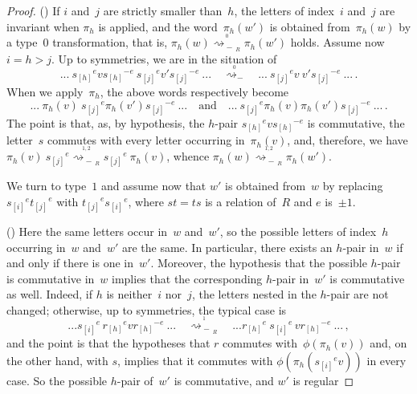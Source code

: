 \documentclass{amsart}
\numberwithin{equation}{section}
\theoremstyle{plain}
\theoremstyle{definition}
\newcounter{ITEM}
\begin{document}
\begin{proof}
{\setcounter{ITEM}{2}\leavevmode\hbox{\rm()}} If ${i}$ and~${j}$ are strictly smaller than~${h}$, the letters of index~${i}$ and~${j}$ are invariant when $\pi_{h}$ is applied, and the word~$\pi_{h}({w}')$ is obtained from~$\pi_{h}({w})$ by a type~$0$ transformation, that is, $\pi_{h}({w}) {\mathrel{\overset{{}_{{0}}}{\rightsquigarrow_{\!\!\!\!\!\!-\,{{\!{}_{R}}}}}}} \pi_{h}({w}')$ holds. Assume now ${i} = {h} > {j}$.
Up to symmetries, we are in the situation of
$$ ... \ {{s}_{[{h}]}}^{e} {v} {{s}_{[{h}]}}^{-{e}} \ {{s}_{[{j}]}}^{e} {v}' {{s}_{[{j}]}}^{-{e}} \ ... \quad{\mathrel{\overset{{}_{0}}{\rightsquigarrow_{\!\!\!\!\!\!-}}}}\quad ... \ {{s}_{[{j}]}}^{e} {v} \ {v}' {{s}_{[{j}]}}^{-{e}}\ ... \, .$$
When we apply~$\pi_{h}$, the above words respectively become
$$ ... \ \pi_{h}({v}) \ {{s}_{[{j}]}}^{e} \pi_{h}({v}') {{s}_{[{j}]}}^{-{e}} \ ... \quad \mbox{and}\quad ... \ {{s}_{[{j}]}}^{e} \pi_{h}({v}) \pi_{h}({v}') {{s}_{[{j}]}}^{-{e}} \ ... \, .$$
The point is that, as, by hypothesis, the ${h}$-pair ${{s}_{[{h}]}}^{e} {v} {{s}_{[{h}]}}^{-{e}}$ is commutative, the letter~${s}$ commutes with every letter occurring in~$\pi_{h}({v})$, and, therefore, we have $\pi_{h}({v}) \ {{s}_{[{j}]}}^{e} {\mathrel{\overset{{}_{{1,2}}}{\rightsquigarrow_{\!\!\!\!\!\!-\,{{\!{}_{R}}}}}}} {{s}_{[{j}]}}^{e} \ \pi_{h}({v})$, whence $\pi_{h}({w}) {\mathrel{\overset{{}_{{1,2}}}{\rightsquigarrow_{\!\!\!\!\!\!-\,{{\!{}_{R}}}}}}} \pi_{h}({w}')$.

We turn to type~$1$ and assume now that ${w}'$ is obtained from~${w}$ by replacing ${{s}_{[{i}]}}^{e} {{t}_{[{j}]}}^{e}$ with ${{t}_{[{j}]}}^{e} {{s}_{[{i}]}}^{e}$, where ${s} {t} = {t} {s}$ is a relation of~${R}$ and ${e}$ is~$\pm1$. 

{\setcounter{ITEM}{1}\leavevmode\hbox{\rm()}} Here the same letters occur in~${w}$ and~${w}'$, so the possible letters of index~${h}$ occurring in~${w}$ and~${w}'$ are the same. In particular, there exists an ${h}$-pair in~${w}$ if and only if there is one in~${w}'$. Moreover, the hypothesis that the possible ${h}$-pair is commutative in~${w}$ implies that the corresponding ${h}$-pair in~${w}'$ is commutative as well. Indeed, if ${h}$ is neither~${i}$ nor~${j}$, the letters nested in the ${h}$-pair are not changed; otherwise, up to symmetries, the typical case is
$$ ... {{s}_{[{i}]}}^{e} \, {{r}_{[{h}]}}^{e} {v} {{r}_{[{h}]}}^{-{e}} \ ... \quad{\mathrel{\overset{{}_{1}}{\rightsquigarrow_{\!\!\!\!\!\!-\,{{\!{}_{R}}}}}}}\quad ... {{r}_{[{h}]}}^{e}\ {{s}_{[{i}]}}^{e} \, {v} {{r}_{[{h}]}}^{-{e}}\ ... \, ,$$
and the point is that the hypotheses that ${r}$ commutes with~$\phi(\pi_{h}({v}))$ and, on the other hand, with ${s}$, implies that it commutes with $\phi(\pi_{h}({{s}_{[{i}]}}^{e} {v}))$ in every case. So the possible ${h}$-pair of~${w}'$ is commutative, and ${w}'$ is regular


\end{proof}
\end{document}
